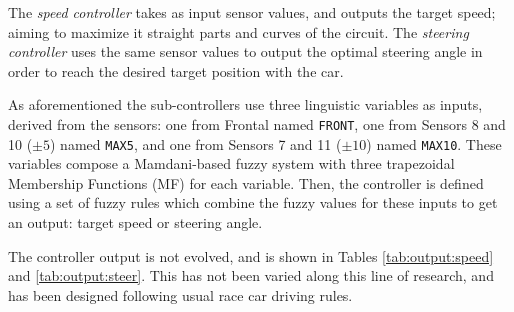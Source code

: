 \documentclass[10pt,journal,compsoc]{IEEEtran}
\begin{document}
The \textit{speed controller} takes as input sensor values, and
outputs the target speed; aiming to maximize it straight parts and curves of the circuit. The \textit{steering controller} uses the same sensor values to output the optimal steering angle in order to reach the desired target position with the car.

As aforementioned the sub-controllers use three linguistic variables as inputs, derived from the sensors: one from Frontal named \texttt{FRONT}, one from Sensors 8 and 10 ($\pm 5$\textdegree) named \texttt{MAX5}, and one from Sensors 7 and 11 ($\pm 10$\textdegree) named \texttt{MAX10}. These variables compose a Mamdani-based fuzzy system \cite{iancu2012} with three trapezoidal Membership Functions (MF) for each variable.
Then, the controller is defined using a set of fuzzy rules which combine the fuzzy values for these inputs to get an output: target speed or steering angle.

The controller output is not evolved, and is shown in Tables \ref{tab:output:speed} and \ref{tab:output:steer}. This has not been
varied along this line of research, and has been designed following
usual race car driving rules. 
\end{document}
